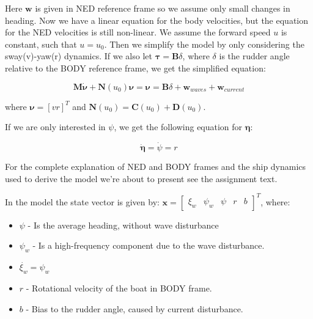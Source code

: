 Here $\mathbf{w}$ is given in NED reference frame so we assume only small changes in heading. Now we have a linear equation for the body velocities, but the equation for the NED velocities is still non-linear. We assume the forward speed $u$ is constant, such that $u = u_0$.
Then we simplify the model by only considering the sway(v)-yaw(r) dynamics. If we also let $\boldsymbol\tau = \mathbf{B}\delta$, where $\delta$ is the rudder angle relative to the BODY reference frame, we get the simplified equation:

\begin{equation}
    \mathbf{M \dot{\nu}} + \mathbf{N} (u_0) \boldsymbol\nu = \boldsymbol\nu = \mathbf{B}\delta + \mathbf{w}_{waves} + \mathbf{w}_{current} \label{eq:simplified_control_inputs}
\end{equation}

where $\boldsymbol\nu = [v r]^T$ and $\mathbf{N}(u_0) = \mathbf{C}(u_0) + \mathbf{D}(u_0)$.

If we are only interested in $\psi$, we get the following equation for $\boldsymbol\eta$:

\begin{equation}
    \dot{\boldsymbol\eta} = \dot{\psi} = r \label{eq:simplified_NED_velocities}
\end{equation}

\fi


For the complete explanation of NED and BODY frames and the ship dynamics used to derive the model we're about to present see the assignment text.

In the model the state vector is given by: $\mathbf{x} = \begin{bmatrix} \xi_w & \psi_w & \psi & r & b \end{bmatrix}^T$, where:

\begin{itemize}
    \item $\psi$ - Is the average heading, without wave disturbance
    \item $\psi_w$ - Is a high-frequency component due to the wave disturbance.
    \item $\dot{\xi_w} = \psi_w$
    \item $r$ - Rotational velocity of the boat in BODY frame.
    \item $b$ - Bias to the rudder angle, caused by current disturbance.
\end{itemize}


